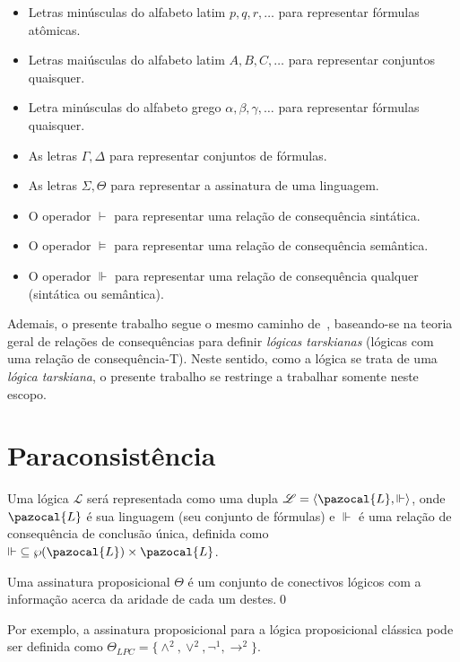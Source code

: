 \begin{itemize}
    \item Letras minúsculas do alfabeto latim $p, q, r, \ldots$ para representar fórmulas atômicas.
    \item Letras maiúsculas do alfabeto latim $A, B, C, \ldots$ para representar conjuntos quaisquer.
    \item Letra minúsculas do alfabeto grego $\alpha, \beta, \gamma, \ldots$ para representar fórmulas quaisquer.
    \item As letras $\Gamma, \Delta$ para representar conjuntos de fórmulas.
    \item As letras $\Sigma, \Theta$ para representar a assinatura de uma linguagem.
    \item O operador $\vdash$ para representar uma relação de consequência sintática.
    \item O operador $\vDash$ para representar uma relação de consequência semântica. 
    \item O operador $\Vdash$ para representar uma relação de consequência qualquer (sintática ou semântica).
\end{itemize}

Ademais, o presente trabalho segue o mesmo caminho de~, baseando-se na teoria geral de relações de consequências para definir \textit{lógicas tarskianas} (lógicas com uma relação de consequência-T). Neste sentido, como a lógica \lfium{} se trata de uma \textit{lógica tarskiana}, o presente trabalho se restringe a trabalhar somente neste escopo.

\section{Paraconsistência}
\label{sec:paracons}

Uma lógica $\mathcal{L}$ será representada como uma dupla $\mathcal{L} = \langle \pazocal{L},\Vdash \rangle$, onde $\pazocal{L}$ é sua linguagem (seu conjunto de fórmulas) e $\Vdash$ é uma relação de consequência de conclusão única, definida como $\Vdash \;\subseteq \wp(\pazocal{L})\times\pazocal{L}$.

\begin{definicao}
    \label{def:ass_prop}
    Uma assinatura proposicional $\Theta$ é um conjunto de conectivos lógicos com a informação acerca da aridade de cada um destes.\qed{}
\end{definicao}
Por exemplo, a assinatura proposicional para a lógica proposicional clássica pode ser definida como $\Theta_{LPC} = \{\land^{2}, \lor^{2}, \neg^{1}, \rightarrow^{2}\}$. 

